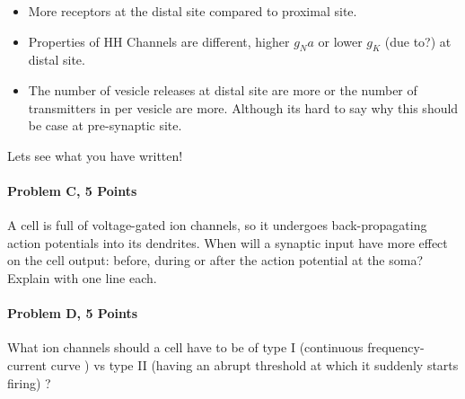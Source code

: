 \documentclass[a4paper,10pt]{article}
\begin{document}
\begin{itemize}
    \item More receptors at the distal site compared to proximal site.
    \item Properties of HH Channels are different, higher $g_Na$ or lower $g_K$ (due
        to?) at distal site.
    \item The number of vesicle releases at distal site are more or the number
        of transmitters in per vesicle are more. Although its hard to say why
        this should be case at pre-synaptic site.
\end{itemize}

Lets see what you have written!


\paragraph{Problem C, 5 Points} A cell is full of voltage-gated ion channels, so
it undergoes back-propagating action potentials into its dendrites. When will a
synaptic input have more effect on the cell output: before, during or after the
action potential at the soma? Explain with one line each.


\paragraph{Problem D, 5 Points} What ion channels should a cell have to be of
type I (continuous frequency-current curve ) vs type II (having an abrupt
threshold at which it suddenly starts firing) ?
\end{document}
